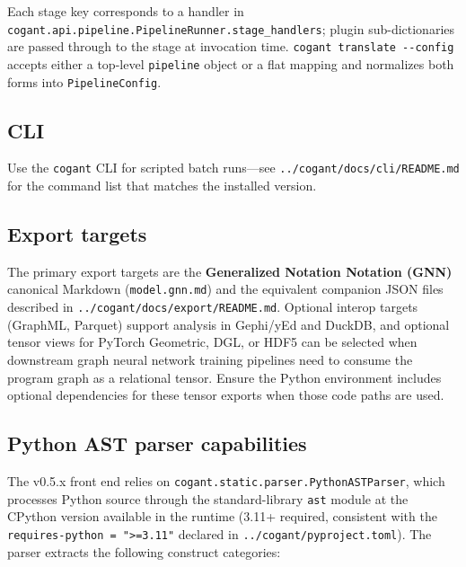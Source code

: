 \documentclass[
]{article}
\begin{document}
Each stage key corresponds to a handler in
\texttt{cogant.api.pipeline.PipelineRunner.stage\_handlers}; plugin
sub-dictionaries are passed through to the stage at invocation time.
\texttt{cogant\ translate\ -\/-config} accepts either a top-level
\texttt{pipeline} object or a flat mapping and normalizes both forms
into \texttt{PipelineConfig}.

\subsection{CLI}\label{cli-1}

Use the \texttt{cogant} CLI for scripted batch runs---see
\texttt{../cogant/docs/cli/README.md} for the command list that matches
the installed version.

\subsection{Export targets}\label{export-targets-1}

The primary export targets are the \textbf{Generalized Notation Notation
(GNN)} canonical Markdown (\texttt{model.gnn.md}) and the equivalent
companion JSON files described in
\texttt{../cogant/docs/export/README.md}. Optional interop targets
(GraphML, Parquet) support analysis in Gephi/yEd and DuckDB, and
optional tensor views for PyTorch Geometric, DGL, or HDF5 can be
selected when downstream graph neural network training pipelines need to
consume the program graph as a relational tensor. Ensure the Python
environment includes optional dependencies for these tensor exports when
those code paths are used.

\subsection{Python AST parser
capabilities}\label{python-ast-parser-capabilities-1}

The v0.5.x front end relies on
\texttt{cogant.static.parser.PythonASTParser}, which processes Python
source through the standard-library \texttt{ast} module at the CPython
version available in the runtime (3.11+ required, consistent with the
\texttt{requires-python\ =\ "\textgreater{}=3.11"} declared in
\texttt{../cogant/pyproject.toml}). The parser extracts the following
construct categories:
\end{document}
